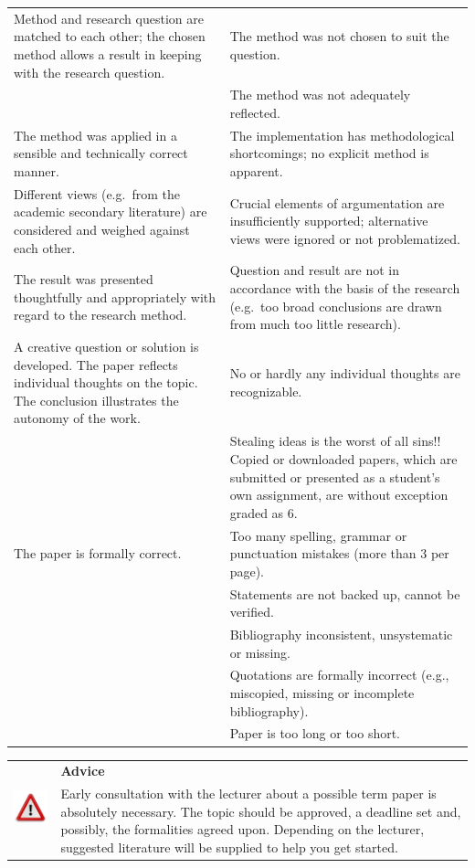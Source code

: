 \documentclass[
  english,
]{scrreprt}
\newlength{\iconwidth}
\newenvironment{displaybox}[2]{%
    \begin{center}
        \setlength\arrayrulewidth{0.75pt}%
        \arrayrulecolor{white}%
        \renewcommand{\arraystretch}{1.3}%
        \begin{tabular}{p{\iconwidth}p{\linewidth-4\tabcolsep-\iconwidth}}
            \multirow{2}{*}{#2}&\cellcolor{boxheadcol}\textbf{\sffamily\color{white}#1} \\%
            \hhline{~-}%
            &\cellcolor{boxcol}%
}{%
            \\
        \end{tabular}
        \arrayrulecolor{black}
    \end{center}
}
\newenvironment{Advice}{%
\begin{displaybox}{Advice}{\includegraphics[width=\iconwidth]{images/icon-hinweis}}}%
{\end{displaybox}}
\begin{document}
\begin{longtable}[]{@{}
  >{\raggedright\arraybackslash}p{}
  >{\raggedright\arraybackslash}p{}@{}}
Method and research question are matched to each other; the chosen method allows a result in keeping with the research question. & The method was not chosen to suit the question. \\
& The method was not adequately reflected. \\
The method was applied in a sensible and technically correct manner. & The implementation has methodological shortcomings; no explicit method is apparent. \\
Different views (e.g.~from the academic secondary literature) are considered and weighed against each other. & Crucial elements of argumentation are insufficiently supported; alternative views were ignored or not problematized. \\
The result was presented thoughtfully and appropriately with regard to the research method. & Question and result are not in accordance with the basis of the research (e.g.~too broad conclusions are drawn from much too little research). \\
A creative question or solution is developed. The paper reflects individual thoughts on the topic. The conclusion illustrates the autonomy of the work. & No or hardly any individual thoughts are recognizable. \\
& Stealing ideas is the worst of all sins!! Copied or downloaded papers, which are submitted or presented as a student’s own assignment, are without exception graded as 6. \\
The paper is formally correct. & Too many spelling, grammar or punctuation mistakes (more than 3 per page). \\
& Statements are not backed up, cannot be verified. \\
& Bibliography inconsistent, unsystematic or missing. \\
& Quotations are formally incorrect (e.g., miscopied, missing or incomplete bibliography). \\
& Paper is too long or too short. \\
\end{longtable}

\begin{Advice}

Early consultation with the lecturer about a possible term paper is absolutely necessary. The topic should be approved, a deadline set and, possibly, the formalities agreed upon. Depending on the lecturer, suggested literature will be supplied to help you get started.

\end{Advice}
\end{document}
